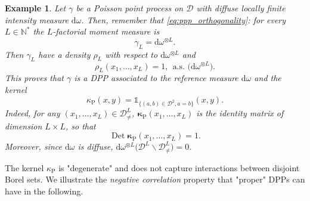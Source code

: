 \documentclass[twoside,11pt]{book}
\newtheorem{example}{Example}
\numberwithin{theorem}{chapter}
\numberwithin{definition}{chapter}
\numberwithin{proposition}{chapter}
\numberwithin{corollary}{chapter}
\numberwithin{example}{chapter}
\numberwithin{lemma}{chapter}
\numberwithin{assumption}{chapter}
\DeclareMathOperator{\Det}{Det}
\begin{document}
\begin{example}
Let $\gamma$ be a Poisson point process on $\mathcal{D}$ with diffuse locally finite intensity measure $\mathrm{d}\omega$. Then, remember that \eqref{eq:ppp_orthogonality}: for every $L \in \mathbb{N}^{*}$ the $L$-factorial moment measure is 
\begin{equation}\label{eq:poisson_gamma_L_is_a_DPP}
\gamma_{L} = \mathrm{d}\omega^{\otimes L}.
\end{equation}
Then $\gamma_{L}$ have a density $\rho_{L}$ with respect to $\mathrm{d}\omega^{\otimes L}$ and
\begin{equation}
\rho_L(x_{1}, \dots, x_{L}) = 1, \:\: \text{a.s. (} \mathrm{d}\omega^{\otimes L} \text{)} .
\end{equation}
This proves that $\gamma$ is a DPP associated to the reference measure $\mathrm{d}\omega$ and the kernel
\begin{equation}\label{eq:the_degenerate_poisson_kernel}
\kappa_{\mathrm{P}}(x,y) = \mathbb{1}_{\{(a,b) \in \mathcal{D}^{2}, a=b \}}(x,y).
\end{equation}
Indeed, for any $(x_{1}, \dots, x_{L}) \in \mathcal{D}^{L}_{\neq} $, $\bm{\kappa}_{\mathrm{P}}(x_{1}, \dots, x_{L})$ is the identity matrix of dimension $L \times L$, so that
\begin{equation}
\Det \bm{\kappa}_{\mathrm{P}}(x_{1}, \dots, x_{L}) = 1.
\end{equation}
Moreover, since $\mathrm{d}\omega$ is diffuse, $\mathrm{d}\omega ^{\otimes L} \Big( \mathcal{D}^{L} \smallsetminus \mathcal{D}^{L}_{\neq} \Big) = 0$. 

\end{example}

The kernel $\kappa_{\mathrm{P}}$ is "degenerate" and does not capture interactions between disjoint Borel sets.
We illustrate the \emph{negative correlation} property that "proper" DPPs can have in the following.
\end{document}
